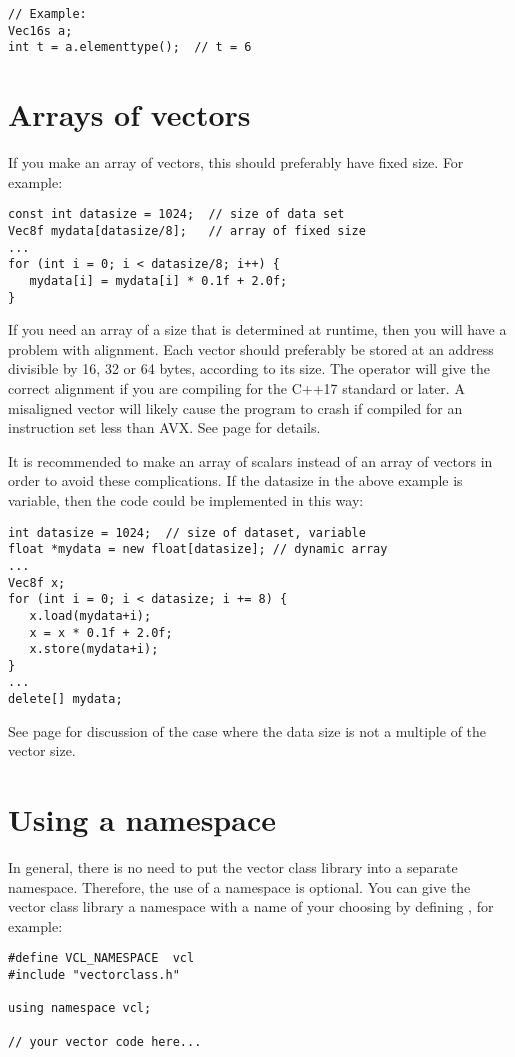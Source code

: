 \documentclass[vcl_manual.tex]{subfiles}
\begin{document}
\begin{lstlisting}[frame=none]
// Example:
Vec16s a;
int t = a.elementtype();  // t = 6
\end{lstlisting}


{}


\section{Arrays of vectors} \label{ArraysOfVectors}

If you make an array of vectors, this should preferably have fixed size. For example:
\begin{lstlisting}[frame=none]
const int datasize = 1024;  // size of data set
Vec8f mydata[datasize/8];   // array of fixed size
...
for (int i = 0; i < datasize/8; i++) {
   mydata[i] = mydata[i] * 0.1f + 2.0f;
}
\end{lstlisting}

If you need an array of a size that is determined at runtime, then you will have a problem with alignment. Each vector should preferably be stored at an address divisible by 16, 32 or 64 bytes, according to its size. 
The operator  will give the correct alignment if you are compiling for the C++17 standard or later.
A misaligned vector will likely cause the program to crash if compiled for an instruction set less than AVX. See page \pageref{Alignment} for details.

It is recommended to make an array of scalars instead of an array of vectors in order to avoid these complications. If the datasize in the above example is variable, then the code could be implemented in this way:

\begin{lstlisting}[frame=none]
int datasize = 1024;  // size of dataset, variable
float *mydata = new float[datasize]; // dynamic array
...
Vec8f x;
for (int i = 0; i < datasize; i += 8) {
   x.load(mydata+i);
   x = x * 0.1f + 2.0f;
   x.store(mydata+i);
}
...
delete[] mydata;
\end{lstlisting}

See page \pageref{NotAMultipleOfVectorSize} for discussion of the case where the data size is not a multiple of the vector size.

\section{Using a namespace} \label{UsingANamespace}

In general, there is no need to put the vector class library into a separate namespace. Therefore, the use of a namespace is optional. You can give the vector class library a namespace with a name of your choosing by defining , for example:

\begin{lstlisting}[frame=single]
#define VCL_NAMESPACE  vcl
#include "vectorclass.h"

using namespace vcl;

// your vector code here...
\end{lstlisting}
\end{document}
